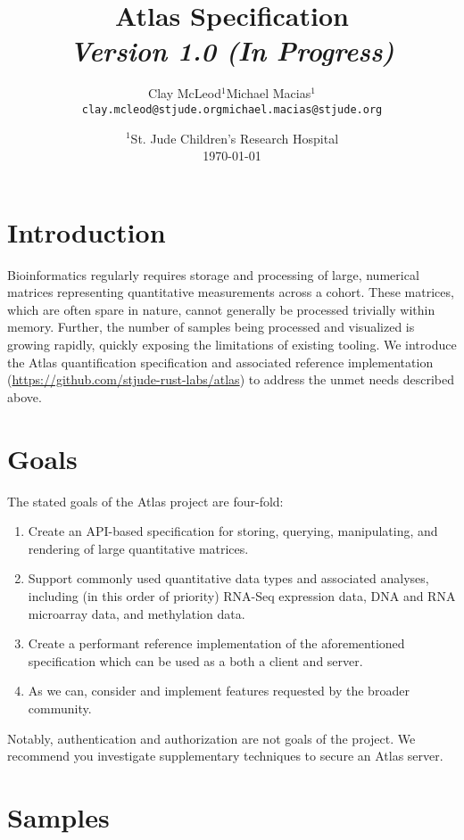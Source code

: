 \documentclass{article}
\title{
    Atlas Specification \\
    {\Large \emph{Version 1.0 (In Progress)}}
}
\author{
    \begin{tabular}[t]{cc}
        Clay McLeod$^1$ & Michael Macias$^1$ \\
        \texttt{clay.mcleod@stjude.org} & \texttt{michael.macias@stjude.org}
    \end{tabular}
}
\date{
    $^1$St. Jude Children's Research Hospital \\[2ex]
    \today
}
\begin{document}
\maketitle
\tableofcontents

\section{Introduction}
Bioinformatics regularly requires storage and processing of large, numerical
matrices representing quantitative measurements across a cohort. These matrices,
which are often spare in nature, cannot generally be processed trivially within
memory. Further, the number of samples being processed and visualized is growing
rapidly, quickly exposing the limitations of existing tooling. We introduce the
Atlas quantification specification and associated reference implementation
(\url{https://github.com/stjude-rust-labs/atlas}) to address the unmet needs
described above.

\section{Goals}

The stated goals of the Atlas project are four-fold:

\begin{enumerate}
    \item Create an API-based specification for storing, querying, manipulating,
          and rendering of large quantitative matrices.
    \item Support commonly used quantitative data types and associated analyses,
          including (in this order of priority) RNA-Seq expression data, DNA and RNA
          microarray data, and methylation data.
    \item Create a performant reference implementation of the aforementioned
          specification which can be used as a both a client and server.
    \item As we can, consider and implement features requested by the broader community.
\end{enumerate}

Notably, authentication and authorization are not goals of the project. We
recommend you investigate supplementary techniques to secure an Atlas server.

\section{Samples}
\label{section:samples}
\end{document}
